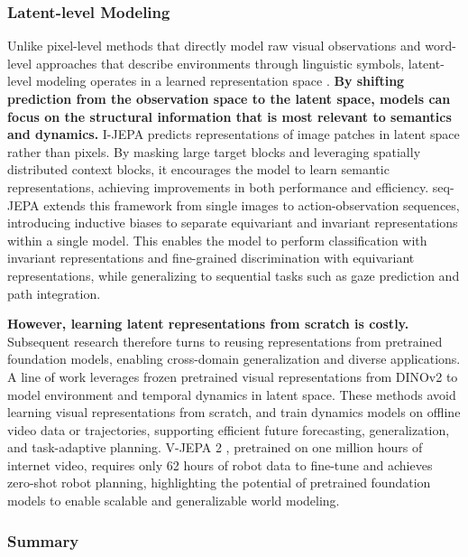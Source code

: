 \documentclass{llmxive}
\begin{document}
\subsubsection{Latent-level Modeling}
\label{sec:Latent-level Modeling}
Unlike pixel-level methods that directly model raw visual observations and word-level approaches that describe environments through linguistic symbols, latent-level modeling operates in a learned representation space \cite{IWM, DINO-WM, seq-JEPA}. 
\textbf{By shifting prediction from the observation space to the latent space, models can focus on the structural information that is most relevant to semantics and dynamics.} I-JEPA \cite{I-JEPA} predicts representations of image patches in latent space rather than pixels. By masking large target blocks and leveraging spatially distributed context blocks, it encourages the model to learn semantic representations, achieving improvements in both performance and efficiency. seq-JEPA \cite{seq-JEPA} extends this framework from single images to action-observation sequences, introducing inductive biases to separate equivariant and invariant representations within a single model. This enables the model to perform classification with invariant representations and fine-grained discrimination with equivariant representations, while generalizing to sequential tasks such as gaze prediction and path integration.

\textbf{However, learning latent representations from scratch is costly.} Subsequent research therefore turns to reusing representations from pretrained foundation models, enabling cross-domain generalization and diverse applications. A line of work \cite{DINO-WM, DINO-world, DINO-Foresight} leverages frozen pretrained visual representations from DINOv2 to model environment and temporal dynamics in latent space. These methods avoid learning visual representations from scratch, and train dynamics models on offline video data or trajectories, supporting efficient future forecasting, generalization, and task-adaptive planning. V-JEPA 2 \cite{V-JEPA_2}, pretrained on one million hours of internet video, requires only 62 hours of robot data to fine-tune and achieves zero-shot robot planning, highlighting the potential of pretrained foundation models to enable scalable and generalizable world modeling.


\subsubsection{Summary}
\end{document}
